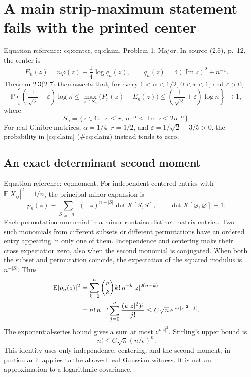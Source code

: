 \documentclass[10pt]{article}
\begin{document}
\section*{A main strip-maximum statement fails with the printed center}
Equation reference: eq:center, eq:claim. Problem 1.  Major. In source (2.5), p. 12, the center is \[
 E_n(z)=n\varphi(z)-\frac14\log q_n(z),
 \qquad q_n(z)=4(\operatorname{Im}z)^2+n^{-1}.\] Theorem 2.3(2.7) then asserts that, for every \(0<\alpha<1/2\), \(0<r<1\), and \(\varepsilon>0\), \[
 \mathbb P\left\{
 \left(\frac1{\sqrt2}-\varepsilon\right)\log n
 \le \max_{z\in S_n}\bigl(P_n(z)-E_n(z)\bigr)
 \le \left(\frac1{\sqrt2}+\varepsilon\right)\log n
 \right\}\longrightarrow1,\] where \[S_n=\{z\in\mathbb C: |z|\le r,\ n^{-\alpha}\le\operatorname{Im}z
                         \le2n^{-\alpha}\}.\] For real Ginibre matrices, \(\alpha=1/4\), \(r=1/2\), and \(\varepsilon=1/\sqrt2-3/5>0\), the probability in [eq:claim] (\#eq:claim) instead tends to zero.\par
\subsection*{An exact determinant second moment}
Equation reference: eq:moment. For independent centered entries with \(\mathbb E|X_{ij}|^2=1/n\), the principal-minor expansion is \[p_n(z)=\sum_{S\subseteq[n]}(-z)^{n-|S|}\det X[S,S],
 \qquad \det X[\varnothing,\varnothing]=1.\] Each permutation monomial in a minor contains distinct matrix entries. Two such monomials from different subsets or different permutations have an ordered entry appearing in only one of them. Independence and centering make their cross expectation zero, also when the second monomial is conjugated. When both the subset and permutation coincide, the expectation of the squared modulus is \(n^{-|S|}\). Thus \[\begin{aligned}
 \mathbb E|p_n(z)|^2
 &=\sum_{k=0}^n {n\choose k}k!\,n^{-k}|z|^{2(n-k)}
 \notag\\
 &=n!\,n^{-n}\sum_{j=0}^n\frac{(n|z|^2)^j}{j!}
 \le C\sqrt n\,e^{\,n(|z|^2-1)}.                 \end{aligned}\] The exponential-series bound gives a sum at most \(e^{n|z|^2}\). Stirling’s upper bound is \[n!\le C\sqrt n(n/e)^n.\] This identity uses only independence, centering, and the second moment; in particular it applies to the allowed real Gaussian witness. It is not an approximation to a logarithmic covariance.\par
\end{document}
